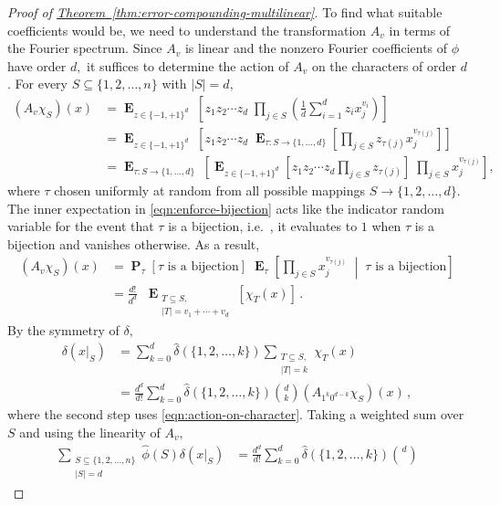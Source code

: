 \documentclass[10pt]{article}
\theoremstyle{definition}
\providecommand{\ie}{i.e.\ }
\numberwithin{equation}{section}
\newcommand{\expref}[2]{\texorpdfstring{\hyperref[#2]{#1~\ref{#2}}}{#1~\ref{#2}}}
\newcommand{\moo}{\{-1,+1\}}
\newcommand{\oneton}{\{1,2,\dots,n\}}
\DeclareMathOperator*{\Exp}{\mathbf{E}}
\DeclareMathOperator*{\Prob}{\mathbf{P}}
\begin{document}
\begin{proof}[Proof of \expref{Theorem}{thm:error-compounding-multilinear}]
To find what suitable coefficients would be, we need to
understand the transformation $A_v$ in terms of the Fourier
spectrum. Since $A_v$ is linear and the nonzero
Fourier coefficients of $\phi$ have order $d,$ it
suffices to determine the action of $A_v$ on the
characters of order $d$. For every $S\subseteq\oneton$
with $|S|=d,$ 
\begin{align}
(A_v\chi_S)(x)
 &= 
\Exp_{z\in\moo^d} \;
\left[z_1z_2\cdots z_d \;\prod_{j\in S}\left(\frac1d\sum_{i=1}^d
z_{i}x_j^{v_i}\right)\right] \nonumber\\
&= 
\Exp_{z\in\moo^d} \;
\left[z_1z_2\cdots z_d \;\Exp_{\tau\colon S\to\{1,\dots,d\}}
\left[\prod_{j\in S}
z_{\tau(j)}x_j^{v_{\tau(j)}}\right]\right] \nonumber\\
&= \Exp_{\tau\colon S\to\{1,\dots,d\}} \;
\left[
\Exp_{z\in\moo^d}\left[z_1z_2\cdots z_d\prod_{j\in S} 
z_{\tau(j)}\right]
\;\prod_{j\in S} x_j^{v_{\tau(j)}}
\right],
\label{eqn:enforce-bijection}
\end{align}
where $\tau$ chosen uniformly at random from all
possible mappings $S\to\{1,2,\dots,d\}$. 
The inner expectation in \eqref{eqn:enforce-bijection} acts like the
indicator random variable for the event that $\tau$ is
a bijection, \ie, it evaluates to $1$ when $\tau$ is a
bijection and vanishes otherwise. As a result,
\begin{align}
(A_v\chi_S)(x)
&= \Prob_\tau [\text{$\tau$ is a bijection}]\;
\Exp_\tau \left[\prod_{j\in S} x_j^{v_{\tau(j)}}
\;\middle|\;  \text{$\tau$ is a bijection}\right]\nonumber\\
 &= 
\frac{d!}{d^d}\;\;
\Exp_{\substack{T\subseteq
S,\\|T|=v_1+\cdots+v_d}}\!\![\chi_T(x)]\,.
\label{eqn:action-on-character}
\end{align}
By the symmetry of $\delta,$ 
\begin{align*}
\delta(x|_S) &= \sum_{k=0}^d \hat\delta(\{1,2,\dots,k\}) \sum_{\substack{T\subseteq
 S,\\|T|=k}}\chi_T(x)\\
 &= \frac{d^d}{d!}\sum_{k=0}^d \hat\delta(\{1,2,\dots,k\}) {d\choose
 k}
 (A_{1^k0^{d-k}}\chi_S)(x)\,,
\end{align*}
where the second step uses
\eqref{eqn:action-on-character}. Taking a weighted sum over $S$ and using the
linearity of $A_v,$ 
\begin{align*}
\sum_{\substack{S\subseteq\oneton\\|S|=d}}
\hat\phi(S)\delta(x|_S) &= 
 \frac{d^d}{d!}\sum_{k=0}^d \hat\delta(\{1,2,\dots,k\}) {d\choose
}
\end{align*}
\end{proof}
\end{document}
